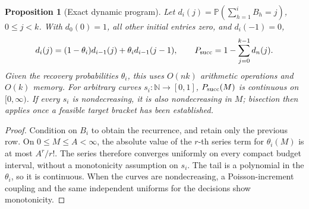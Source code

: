 \documentclass[11pt]{article}
\newtheorem{proposition}[theorem]{Proposition}
\theoremstyle{definition}
\theoremstyle{remark}
\newcommand{\Pbb}{\mathbb P}
\newcommand{\N}{\mathbb N}
\newcommand{\1}{\mathbf 1}
\begin{document}
\begin{proposition}[Exact dynamic program]\label{thm:dp}
Let \(d_i(j)=\Pbb(\sum_{h=1}^iB_h=j)\), \(0\le j<k\).
With \(d_0(0)=1\), all other initial entries zero, and \(d_i(-1)=0\),
\[
 d_i(j)=(1-\theta_i)d_{i-1}(j)+\theta_i d_{i-1}(j-1),\qquad
 P_{\rm succ}=1-\sum_{j=0}^{k-1}d_n(j).
\]
Given the recovery probabilities \(\theta_i\), this uses \(O(nk)\)
arithmetic operations and \(O(k)\) memory. For arbitrary curves
\(s_i:\N\to[0,1]\), \(P_{\rm succ}(M)\) is continuous on
\([0,\infty)\). If every \(s_i\) is nondecreasing, it is also
nondecreasing in \(M\); bisection then applies once a feasible target
bracket has been established.
\end{proposition}
\begin{proof}
Condition on \(B_i\) to obtain the recurrence, and retain only the
previous row. On \(0\le M\le A<\infty\), the absolute value of
the \(r\)-th series term for \(\theta_i(M)\) is at most
\(A^r/r!\). The series therefore converges uniformly on every compact
budget interval, without a monotonicity assumption on \(s_i\).
The tail is a polynomial in the \(\theta_i\), so it is continuous.
When the curves are nondecreasing, a Poisson-increment coupling and
the same independent uniforms for the decisions show monotonicity.
\end{proof}
\end{document}
